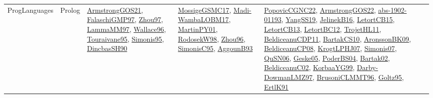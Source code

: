 {\begin{longtable}{lp{3cm}>{\raggedright}p{6cm}>{\raggedright}p{6cm}p{8cm}}
ProgLanguages & Prolog & \href{papers/ArmstrongGOS21.pdf}{ArmstrongGOS21}\cite{ArmstrongGOS21}, \href{articles/FalaschiGMP97.pdf}{FalaschiGMP97}\cite{FalaschiGMP97}, \href{articles/Zhou97.pdf}{Zhou97}\cite{Zhou97}, \href{articles/LammaMM97.pdf}{LammaMM97}\cite{LammaMM97}, \href{articles/Wallace96.pdf}{Wallace96}\cite{Wallace96}, \href{papers/Touraivane95.pdf}{Touraivane95}\cite{Touraivane95}, \href{papers/Simonis95.pdf}{Simonis95}\cite{Simonis95}, \href{articles/DincbasSH90.pdf}{DincbasSH90}\cite{DincbasSH90} & \href{papers/MossigeGSMC17.pdf}{MossigeGSMC17}\cite{MossigeGSMC17}, \href{papers/Madi-WambaLOBM17.pdf}{Madi-WambaLOBM17}\cite{Madi-WambaLOBM17}, \href{articles/MartinPY01.pdf}{MartinPY01}\cite{MartinPY01}, \href{papers/RodosekW98.pdf}{RodosekW98}\cite{RodosekW98}, \href{papers/Zhou96.pdf}{Zhou96}\cite{Zhou96}, \href{papers/SimonisC95.pdf}{SimonisC95}\cite{SimonisC95}, \href{articles/AggounB93.pdf}{AggounB93}\cite{AggounB93} & \href{papers/PopovicCGNC22.pdf}{PopovicCGNC22}\cite{PopovicCGNC22}, \href{papers/ArmstrongGOS22.pdf}{ArmstrongGOS22}\cite{ArmstrongGOS22}, \href{articles/abs-1902-01193.pdf}{abs-1902-01193}\cite{abs-1902-01193}, \href{papers/YangSS19.pdf}{YangSS19}\cite{YangSS19}, \href{papers/JelinekB16.pdf}{JelinekB16}\cite{JelinekB16}, \href{articles/LetortCB15.pdf}{LetortCB15}\cite{LetortCB15}, \href{papers/LetortCB13.pdf}{LetortCB13}\cite{LetortCB13}, \href{papers/LetortBC12.pdf}{LetortBC12}\cite{LetortBC12}, \href{articles/TrojetHL11.pdf}{TrojetHL11}\cite{TrojetHL11}, \href{articles/BeldiceanuCDP11.pdf}{BeldiceanuCDP11}\cite{BeldiceanuCDP11}, \href{articles/BartakCS10.pdf}{BartakCS10}\cite{BartakCS10}, \href{papers/AronssonBK09.pdf}{AronssonBK09}\cite{AronssonBK09}, \href{papers/BeldiceanuCP08.pdf}{BeldiceanuCP08}\cite{BeldiceanuCP08}, \href{papers/KrogtLPHJ07.pdf}{KrogtLPHJ07}\cite{KrogtLPHJ07}, \href{articles/Simonis07.pdf}{Simonis07}\cite{Simonis07}, \href{papers/QuSN06.pdf}{QuSN06}\cite{QuSN06}, \href{papers/Geske05.pdf}{Geske05}\cite{Geske05}, \href{articles/PoderBS04.pdf}{PoderBS04}\cite{PoderBS04}, \href{papers/Bartak02.pdf}{Bartak02}\cite{Bartak02}, \href{papers/BeldiceanuC02.pdf}{BeldiceanuC02}\cite{BeldiceanuC02}, \href{papers/KorbaaYG99.pdf}{KorbaaYG99}\cite{KorbaaYG99}, \href{articles/Darby-DowmanLMZ97.pdf}{Darby-DowmanLMZ97}\cite{Darby-DowmanLMZ97}, \href{papers/BrusoniCLMMT96.pdf}{BrusoniCLMMT96}\cite{BrusoniCLMMT96}, \href{papers/Goltz95.pdf}{Goltz95}\cite{Goltz95}, \href{papers/ErtlK91.pdf}{ErtlK91}\cite{ErtlK91}\\

\end{longtable}}
